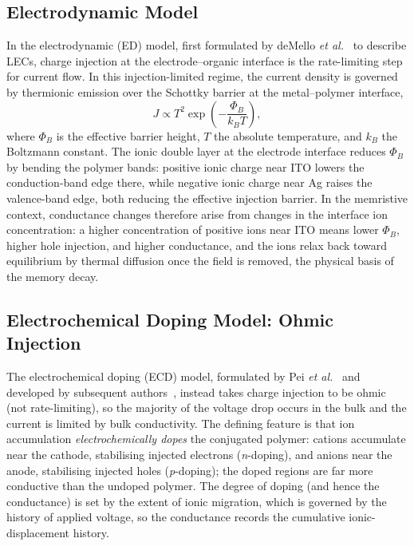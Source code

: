 \subsection{Electrodynamic Model}

In the electrodynamic (ED) model, first formulated by deMello \textit{et al.}~\cite{deMello1998, deMello2002} to describe LECs, charge injection at the electrode--organic interface is the rate-limiting step for current flow. In this injection-limited regime, the current density is governed by thermionic emission over the Schottky barrier at the metal--polymer interface,
\begin{equation}
  J \propto T^2 \exp\!\left(-\frac{\Phi_B}{k_B T}\right),
  \label{eq:thermionic}
\end{equation}
where $\Phi_B$ is the effective barrier height, $T$ the absolute temperature, and $k_B$ the Boltzmann constant. The ionic double layer at the electrode interface reduces $\Phi_B$ by bending the polymer bands: positive ionic charge near ITO lowers the conduction-band edge there, while negative ionic charge near Ag raises the valence-band edge, both reducing the effective injection barrier. In the memristive context, conductance changes therefore arise from changes in the interface ion concentration: a higher concentration of positive ions near ITO means lower $\Phi_B$, higher hole injection, and higher conductance, and the ions relax back toward equilibrium by thermal diffusion once the field is removed, the physical basis of the memory decay.

\subsection{Electrochemical Doping Model: Ohmic Injection}

The electrochemical doping (ECD) model, formulated by Pei \textit{et al.}~\cite{Pei1995} and developed by subsequent authors~\cite{Smith1997, Matyba2009}, instead takes charge injection to be ohmic (not rate-limiting), so the majority of the voltage drop occurs in the bulk and the current is limited by bulk conductivity. The defining feature is that ion accumulation \textit{electrochemically dopes} the conjugated polymer: cations accumulate near the cathode, stabilising injected electrons (\textit{n}-doping), and anions near the anode, stabilising injected holes (\textit{p}-doping); the doped regions are far more conductive than the undoped polymer. The degree of doping (and hence the conductance) is set by the extent of ionic migration, which is governed by the history of applied voltage, so the conductance records the cumulative ionic-displacement history.

